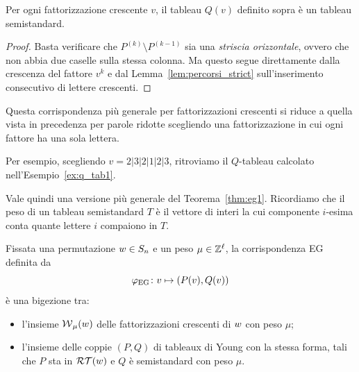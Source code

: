\begin{proposition}
    Per ogni fattorizzazione crescente $v$, il tableau $Q(v)$ definito sopra \`e un 
    tableau semistandard.
\end{proposition}

\begin{proof}
    Basta verificare che $P^{(k)} \setminus P^{(k-1)}$ sia una \emph{striscia orizzontale}, 
    ovvero che non abbia due caselle sulla stessa colonna.
    Ma questo segue direttamente dalla crescenza del fattore $v^k$ e dal
    Lemma~\ref{lem:percorsi_strict} 
    sull'inserimento consecutivo di lettere crescenti.
\end{proof}

\begin{remark}
    Questa corrispondenza pi\`u generale per fattorizzazioni crescenti si riduce a quella
    vista in precedenza per parole ridotte scegliendo una fattorizzazione in cui ogni
    fattore ha una sola lettera.

    Per esempio, scegliendo $v = 2|3|2|1|2|3$, ritroviamo il $Q$-tableau calcolato
    nell'Esempio~\ref{ex:q_tab1}.
\end{remark}

Vale quindi una versione pi\`u generale del Teorema~\ref{thm:eg1}.
Ricordiamo che il peso di un tableau semistandard $T$ \`e il vettore di interi
la cui componente $i$-esima conta quante lettere $i$ compaiono in $T$.

\begin{theorem}
    \label{thm:eg2}
    Fissata una permutazione $w \in S_n$ e un peso $\mu \in \mathbb{Z}^\ell$,
    la corrispondenza EG definita da
    \[
        \varphi_{\mathrm{EG}} \colon v \mapsto (P(v), Q(v))
    \]
    \`e una bigezione tra:
    \begin{itemize}
        \item l'insieme $\operatorname{\mathcal{W}}_\mu(w)$ delle fattorizzazioni crescenti
            di $w$ con peso $\mu$;
        \item l'insieme delle coppie $(P,Q)$ di tableaux di Young con la stessa forma,
            tali che $P$ sta in $\operatorname{\mathcal{RT}}(w)$ e
            $Q$ \`e semistandard con peso $\mu$.
    \end{itemize}
\end{theorem}

